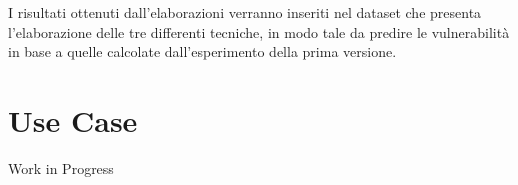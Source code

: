 \documentclass{article}
\begin{document}
I risultati ottenuti dall'elaborazioni verranno inseriti nel dataset che presenta l'elaborazione delle tre differenti tecniche, in modo tale da predire le vulnerabilità in base a quelle calcolate dall'esperimento della prima versione.



\section{Use Case}

Work in Progress








\end{document}

